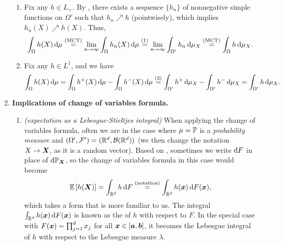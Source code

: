 \begin{enumerate}
\begin{pf}
\begin{enumerate}[label={(\arabic*)}]
\item Fix any \(h\in L_{+}\). By , there exists a sequence
\(\{h_n\}\) of nonnegative simple functions on \(\Omega'\) such that
\(h_n\nearrow h\) (pointwisely), which implies \(h_n(X)\nearrow h(X)\). Thus,
\[
\int_{\Omega}^{}h(X)\odif{\mu}
\overset{\text{(MCT)}}{=}\lim_{n\to\infty}\int_{\Omega}^{}h_n(X)\odif{\mu}
\overset{(1)}{=}\lim_{n\to\infty}\int_{\Omega'}^{}h_n\odif{\mu_X}
\overset{\text{(MCT)}}{=}
\int_{\Omega}^{}h\odif{\mu_X}.
\]
\item Fix any \(h\in L^{1}\), and we have
\[
\int_{\Omega}^{}h(X)\odif{\mu}=
\int_{\Omega}^{}h^{+}(X)\odif{\mu}
-\int_{\Omega}^{}h^{-}(X)\odif{\mu}
\overset{(2)}{=}
\int_{\Omega'}^{}h^{+}\odif{\mu_X}
-\int_{\Omega'}^{}h^{-}\odif{\mu_X}
=\int_{\Omega'}^{}h\odif{\mu_X}.
\]
\end{enumerate}
\end{pf}
\item \textbf{Implications of change of variables formula.}
\begin{enumerate}
\item \emph{(expectation as a Lebesgue-Stieltjes integral)}
\label{it:lebesgue-stieljes-int} When applying the change of variables formula,
often we are in the case where \(\mu=\mathbb{P}\) is a \emph{probability measure} and
\((\Omega',\mathcal{F}')=(\mathbb{R}^{d},\mathcal{B}(\mathbb{R}^d))\) (we then change the
notation \(X\to\bm{X}\), as it is a random vector). Based on
, sometimes we write \(\odif{F}\) in place of
\(\odif{\pr_{\vect{X}}}\), so the change of variables formula in this case
would become
\[
\expv{h(\vect{X})}=\int_{\R^d}^{}h\odif{F}\overset{\text{(notation)}}{=}\int_{\R^d}^{}h(\vect{x})\odif{F(\vect{x})},
\]
which takes a form that is more familiar to us. The integral
\(\int_{\R^d}^{}h(\vect{x})\odif{F(\vect{x})}\) is known as the
 of \(h\) with respect to \(F\).
In the special case with \(F(\bm{x})=\prod_{j=1}^{d}x_j\) for all
\(\bm{x}\in[\bm{a},\bm{b}]\), it becomes the Lebesgue integral of \(h\)
with respect to the Lebesgue measure \(\lambda\).


\end{enumerate}
\end{enumerate}
